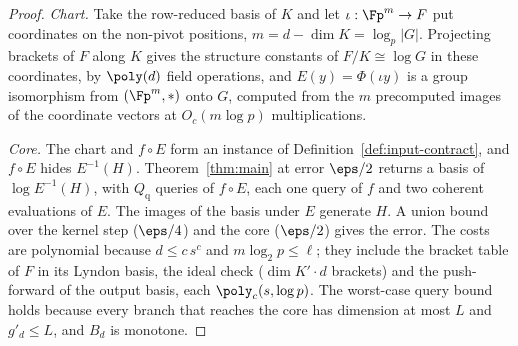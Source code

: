 \begin{proof}
\emph{Chart.} Take the row-reduced basis of $K$ and let $\iota : \Fp^m \to F$ put coordinates on the non-pivot positions, $m = d - \dim K = \log_p|G|$. Projecting brackets of $F$ along $K$ gives the structure constants of $F/K \cong \log G$ in these coordinates, by $\poly(d)$ field operations, and $E(y) = \Phi(\iota y)$ is a group isomorphism from $(\Fp^m,\ast)$ onto $G$, computed from the $m$ precomputed images of the coordinate vectors at $O_c(m\log p)$ multiplications.

\emph{Core.} The chart and $f \circ E$ form an instance of Definition~\ref{def:input-contract}, and $f \circ E$ hides $E^{-1}(H)$. Theorem~\ref{thm:main} at error $\eps/2$ returns a basis of $\log E^{-1}(H)$, with $Q_{\mathrm q}$ queries of $f\circ E$, each one query of $f$ and two coherent evaluations of $E$. The images of the basis under $E$ generate $H$. A union bound over the kernel step ($\eps/4$) and the core ($\eps/2$) gives the error. The costs are polynomial because $d \le c\,s^c$ and $m\log_2 p \le \ell$; they include the bracket table of $F$ in its Lyndon basis, the ideal check ($\dim K' \cdot d$ brackets) and the push-forward of the output basis, each $\poly_c(s,\log p)$. The worst-case query bound holds because every branch that reaches the core has dimension at most $L$ and $g'_d \le L$, and $B_d$ is monotone.
\end{proof}

